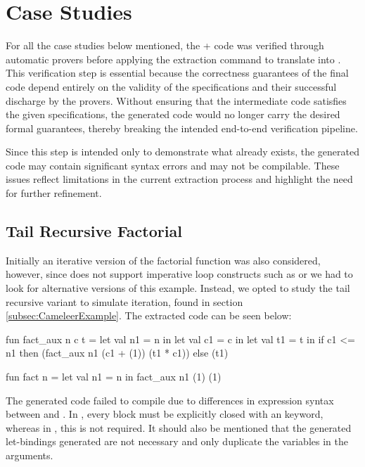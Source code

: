 \section{Case Studies}
\label{sec:Case_Studies}

For all the case studies below mentioned, the \ocaml + \gospel code was verified through \whythree automatic
provers before applying the extraction command to translate into \cml. This verification step is essential because the correctness 
guarantees of the final \cml code depend entirely on the validity of the specifications and their successful discharge by the 
provers. Without ensuring that the \whyml intermediate code satisfies the given specifications, the generated \cml code would 
no longer carry the desired formal guarantees, thereby breaking the intended end-to-end verification pipeline.

Since this step is intended only to demonstrate what already exists, the generated code may contain significant syntax errors 
and may not be compilable. These issues reflect limitations in the current extraction process and highlight the need for 
further refinement.

\subsection{Tail Recursive Factorial}

Initially an iterative version of the factorial function was also considered, however, since \cml does not support imperative loop 
constructs such as  or  we had to look for alternative versions of this example. Instead, we opted 
to study the tail recursive variant to simulate iteration, found in section \ref{subsec:CameleerExample}. The extracted code can be seen below:

\begin{cakeml}
fun fact_aux n c t = let val n1 = n in
  let val c1 = c in
  let val t1 = t in
  if c1 <= n1 then (fact_aux n1 (c1 + (1)) (t1 * c1))  else (t1)

fun fact n = let val n1 = n in fact_aux n1 (1) (1)
\end{cakeml}

The generated \cml code failed to compile due to differences in  expression syntax between \ocaml and \cml. In \cml, every 
 block must be explicitly closed with an  keyword, whereas in \ocaml, this is not required. It should
also be mentioned that the generated let-bindings generated are not necessary and only duplicate the variables in the arguments.

